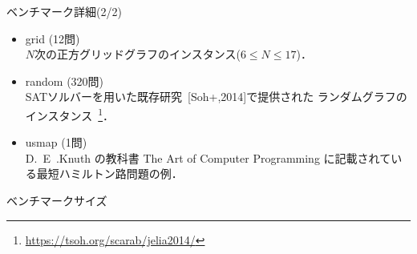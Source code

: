 \documentclass[dvipdfmx]{beamer}
\begin{document}
\begin{frame}[noframenumbering]{ベンチマーク詳細(2/2)}
\begin{itemize}
\item \textsf{grid} (12問)\\
  $N$次の正方グリッドグラフのインスタンス($6\leq N\leq 17$)．
\item \textsf{random} (320問)\\
  SATソルバーを用いた既存研究~{\scriptsize[Soh+,2014]}で提供された
  ランダムグラフのインスタンス~\footnote{\url{https://tsoh.org/scarab/jelia2014/}}．
\item \textsf{usmap} (1問)\\
  D.~E~.Knuth の教科書
  The Art of Computer Programming 
  に記載されている最短ハミルトン路問題の例．
\end{itemize}
\end{frame}

\begin{frame}[noframenumbering]{ベンチマークサイズ}


  
\end{frame}
\end{document}
